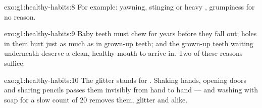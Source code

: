 \begin{solution}{exo:g1:healthy-habits:8}
For example: yawning, stinging or heavy , grumpiness for no
reason.
\end{solution}

\begin{solution}{exo:g1:healthy-habits:9}
Baby teeth must chew for years before they fall out; holes in
them hurt just as much as in grown-up teeth; and the grown-up
teeth waiting underneath deserve a clean, healthy mouth to arrive
in. Two of these reasons suffice.
\end{solution}

\begin{solution}{exo:g1:healthy-habits:10}
The glitter stands for . Shaking hands, opening doors and
sharing pencils passes them invisibly from hand to hand --- and
washing with soap for a slow count of $20$ removes them, glitter
and  alike.
\end{solution}
